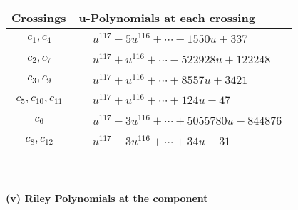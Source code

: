 \documentclass[1p]{elsarticle_modified}
\theoremstyle{definition}
\begin{document}
\begin{tabular}{m{50pt}|m{274pt}}
Crossings & \hspace{64pt}u-Polynomials at each crossing \\
\hline $$\begin{aligned}c_{1},c_{4}\end{aligned}$$&$\begin{aligned}
&u^{117}-5 u^{116}+\cdots-1550 u+337
\end{aligned}$\\
\hline $$\begin{aligned}c_{2},c_{7}\end{aligned}$$&$\begin{aligned}
&u^{117}+u^{116}+\cdots-522928 u+122248
\end{aligned}$\\
\hline $$\begin{aligned}c_{3},c_{9}\end{aligned}$$&$\begin{aligned}
&u^{117}+u^{116}+\cdots+8557 u+3421
\end{aligned}$\\
\hline $$\begin{aligned}c_{5},c_{10},c_{11}\end{aligned}$$&$\begin{aligned}
&u^{117}+u^{116}+\cdots+124 u+47
\end{aligned}$\\
\hline $$\begin{aligned}c_{6}\end{aligned}$$&$\begin{aligned}
&u^{117}-3 u^{116}+\cdots+5055780 u-844876
\end{aligned}$\\
\hline $$\begin{aligned}c_{8},c_{12}\end{aligned}$$&$\begin{aligned}
&u^{117}-3 u^{116}+\cdots+34 u+31
\end{aligned}$\\
\hline
\end{tabular}\\~\\
\newpage\renewcommand{\arraystretch}{1}
\flushleft \textbf{(v) Riley Polynomials at the component}\newline \\
\end{document}
